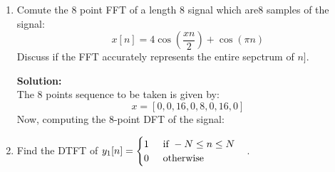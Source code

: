 \documentclass[12pt]{article}
\begin{document}
\begin{enumerate}
	\textbf{Solution:} \\
	Mod-4 reduction of x is given by:
	\begin{equation}
		x = [3 , 3, 3, 3]
	\end{equation}
	Now, computing the 4-point DFT of the reduced signal:
\begin{equation}
		\left[
	\begin{matrix}
		1 & 1 & 1 & 1 \\
		1 & -j & -1 & j \\
		1 & -1 & 1 & -1 \\
		1 & j & -1 & -j 
	\end{matrix}
	\right]
	\times
		\left[
	\begin{matrix}
		3 \\
		3 \\
		3 \\
		3 
	\end{matrix}
	\right]
	 = 
	 	\left[
	 \begin{matrix}
		 12 \\ 
		 0 \\
		 0 \\
		 0
	 \end{matrix}
	 \right]
\end{equation}
	
This question basically shows that to compute reduced points DFT, taking the mod-N version of the main sequence provides you with a more efficient way of computing the DFT.

	\item Comute the 8 point FFT of a length 8 signal which are8 samples of the signal:
		\begin{equation}
			x[n] = 4\cos\left(\frac{xn}{2}\right) + \cos(\pi n)
		\end{equation}
		Discuss if the FFT accurately represents the entire sepctrum of $n]$.

		\textbf{Solution:} \\
		The 8 points sequence to be taken is given by:
		\begin{equation}
			x = [ 0, 0, 16, 0, 8, 0, 16, 0]
		\end{equation}
		Now, computing the 8-point DFT of the signal:
		
	\item Find the DTFT of $y_1[n] = \begin{cases} 1 \hspace{5mm} \text{if } -N \leq n \leq N \\ 0 \hspace{5mm} \text{otherwise} \end{cases}$.


\end{enumerate}
\end{document}
